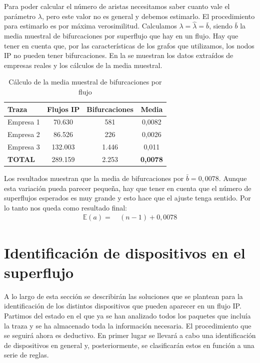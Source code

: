 \documentclass[twoside, 12pt]{epstfg}
\begin{document}
Para poder calcular el número de aristas necesitamos saber cuanto vale el parámetro $\lambda$, pero este valor no es general y debemos estimarlo. El procedimiento para estimarlo es por máxima verosimilitud. Calculamos $\lambda = \widehat{\lambda} = \bar{b}$, siendo $\bar{b}$ la media muestral de bifurcaciones por superflujo que hay en un flujo. Hay que tener en cuenta que, por las características de los grafos que utilizamos, los nodos IP no pueden tener bifurcaciones. En la  se muestran los datos extraídos de empresas reales y los cálculos de la media muestral.
\begin{table}[hbtp]
	\centering
	\begin{tabular}{lccc}
		\toprule \textbf{Traza} & \textbf{Flujos IP}  & \textbf{Bifurcaciones} & \textbf{Media} \\ 
		\midrule
		Empresa 1 & 70.630 & 581 & 0,0082 \\
		Empresa 2 & 86.526 & 226 & 0,0026 \\
		Empresa 3 & 132.003 & 1.446 & 0,011 \\
		\textbf{TOTAL} & 289.159 & 2.253 & \textbf{0,0078} \\
		\bottomrule
	\end{tabular}
	\caption{Cálculo de la media muestral de bifurcaciones por flujo}
	\label{tab:Analisis:Media bifurcaciones}
\end{table}

Los resultados muestran que la media de bifurcaciones por $\bar{b} = 0,0078$. Aunque esta variación pueda parecer pequeña, hay que tener en cuenta que el número de superflujos esperados es muy grande y esto hace que el ajuste tenga sentido. Por lo tanto nos queda como resultado final:
\begin{align*}
 \mathbb{E}(a) =&\ (n - 1) + 0,0078
\end{align*}

\section{Identificación de dispositivos en el superflujo}
\label{sec:Analisis:Dispositivos}
A lo largo de esta sección se describirán las soluciones que se plantean para la identificación de los distintos dispositivos que pueden aparecer en un flujo IP. Partimos del estado en el que ya se han analizado todos los paquetes que incluía la traza y se ha almacenado toda la información necesaria. El procedimiento que se seguirá ahora es deductivo. En primer lugar se llevará a cabo una identificación de dispositivos en general y, posteriormente, se clasificarán estos en función a una serie de reglas.
\end{document}
